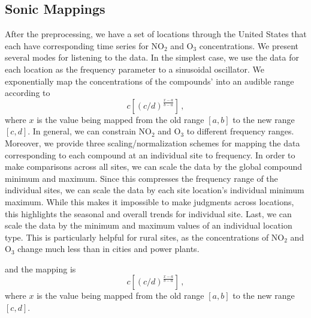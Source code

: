 \documentclass[a4paper,10pt,oneside]{article}
\newcommand{\ce}[1]{$\mathrm{#1}$}
\begin{document}
\begin{sloppy}
\subsection{Sonic Mappings}
\label{sec:sonic-mappings}
After the preprocessing, we have a set of locations through the United States that each have corresponding time series for \ce{NO_2} and \ce{O_3} concentrations. We present several modes for listening to the data. In the simplest case, we use the data for each location as the frequency parameter to a sinusoidal oscillator.  We exponentially map the concentrations of the compounds' into an audible range according to
\begin{equation}
    c \left[(c/d)^{\frac{x-a}{b-a}}\right]\,,
\end{equation}
where $x$ is the value being mapped from the old range $[a, b]$ to the new range $[c, d]$.  In general, we can constrain \ce{NO_2} and \ce{O_3} to different frequency ranges.  Moreover, we provide three scaling/normalization schemes for mapping the data corresponding to each compound at an individual site to frequency. In order to make comparisons across all sites, we can scale the data by the global compound minimum and maximum.  Since this compresses the frequency range of the individual sites, we can scale the data by each site location's individual minimum maximum. While this makes it impossible to make judgments across locations, this highlights the seasonal and overall trends for individual site. Last, we can scale the data by the minimum and maximum values of an individual location type. This is particularly helpful for rural sites, as the concentrations of \ce{NO_2} and \ce{O_3} change much less than in cities and power plants. 

and the mapping is
\begin{equation}
    c \left[(c/d)^{\frac{x-a}{b-a}}\right]\,,
\end{equation}
where $x$ is the value being mapped from the old range $[a, b]$ to the new range $[c, d]$.  


\end{sloppy}
\end{document}
